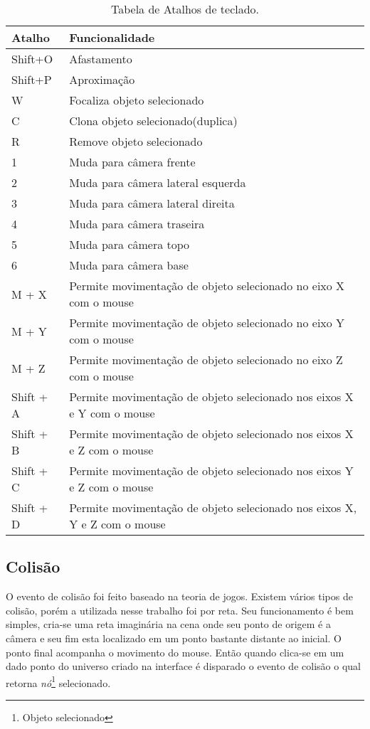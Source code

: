 \begin{table}
\centering
\begin{tabular}{|l|l|}
	\hline
		Atalho & Funcionalidade \\ \hline
		Shift+O &  Afastamento\\ \hline
		Shift+P &  Aproximação\\ \hline
		W & Focaliza objeto selecionado\\ \hline
		C & Clona objeto selecionado(duplica)\\ \hline
		R & Remove objeto selecionado \\ \hline
		1 & Muda para câmera frente \\ \hline
		2 & Muda para câmera lateral esquerda \\ \hline
		3 & Muda para câmera lateral direita \\ \hline
		4 & Muda para câmera traseira \\ \hline
		5 & Muda para câmera topo \\ \hline
		6 & Muda para câmera base \\ \hline
		M + X & Permite movimentação de objeto selecionado no eixo X com o mouse \\ \hline
		M + Y & Permite movimentação de objeto selecionado no eixo Y com o mouse \\ \hline
		M + Z & Permite movimentação de objeto selecionado no eixo Z com o mouse \\ \hline
		Shift + A & Permite movimentação de objeto selecionado nos eixos X e Y com o mouse \\ \hline
		Shift + B & Permite movimentação de objeto selecionado nos eixos X e Z com o mouse \\ \hline
		Shift + C & Permite movimentação de objeto selecionado nos eixos Y e Z com o mouse \\ \hline
		Shift + D & Permite movimentação de objeto selecionado nos eixos X, Y e Z com o mouse \\ 
	\hline
\end{tabular}
\caption{Tabela de Atalhos de teclado.}
\label{tb:shortcuts}
\end{table}
	
	\subsection{Colisão}
	O evento de colisão foi feito baseado na teoria de jogos. Existem vários tipos de colisão, porém a utilizada nesse trabalho foi por reta. Seu funcionamento é bem simples, cria-se uma reta imaginária na cena onde seu ponto de origem é a câmera e seu fim esta localizado em um ponto bastante distante ao inicial. O ponto final acompanha o movimento do mouse. Então quando clica-se em um dado ponto do universo criado na interface é disparado o evento de colisão o qual retorna \textit{nó}\footnote{Objeto selecionado} selecionado. \\
	
